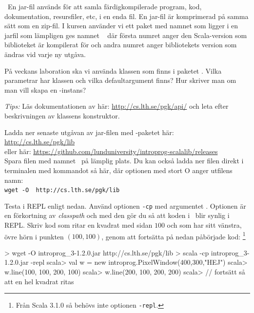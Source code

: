 \QUESTEND



\QUESTBEGIN

\Task \what~En jar-fil används för att samla färdigkompilerade program, kod, dokumentation, resursfiler, etc, i en enda fil. En jar-fil är komprimerad på samma sätt som en zip-fil. I kursen använder vi ett paket med namnet  som ligger i en jarfil som lämpligen ges namnet \LibJar~ där första numret anger den Scala-version som biblioteket är kompilerat för och andra numret anger bibliotekets version som ändras vid varje ny utgåva.

\Subtask På veckans laboration ska vi använda klassen  som finns i paketet . Vilka parametrar har klassen  och vilka defaultargument finns? Hur skriver man om man vill skapa en -instans?

\emph{Tips:}  Läs dokumentationen av  här: \url{http://cs.lth.se/pgk/api/}
och leta efter beskrivningen av klassens konstruktor.

\Subtask Ladda ner senaste utgåvan av jar-filen med -paketet här:
\\\url{http://cs.lth.se/pgk/lib}\\eller här: \url{https://github.com/lunduniversity/introprog-scalalib/releases}
\\ Spara filen med namnet  \LibJar~på lämplig plats. Du kan också ladda ner filen direkt i terminalen med kommandot  så här, där optionen  med stort O anger utfilens namn:\\
\texttt{wget -O \LibJar~http://cs.lth.se/pgk/lib}

\Subtask Testa  i REPL enligt nedan. Använd optionen \texttt{-cp} med argumentet \LibJar. Optionen  är en förkortning av \emph{classpath} och med den gör du så att koden i \LibJar~blir synlig i REPL.  Skriv kod som ritar en kvadrat med sidan $100$ och som har sitt vänstra, övre hörn i punkten $(100,100)$, genom att fortsätta på nedan påbörjade kod: \footnote{Från Scala 3.1.0 så behövs inte optionen \texttt{-repl}.}

\begin{REPL}
> wget -O introprog_3-1.2.0.jar http://cs.lth.se/pgk/lib
> scala -cp introprog_3-1.2.0.jar -repl
scala> val w = new introprog.PixelWindow(400,300,"HEJ")
scala> w.line(100, 100, 200, 100)
scala> w.line(200, 100, 200, 200)
scala> // fortsätt så att en hel kvadrat ritas
\end{REPL}

